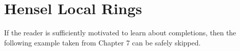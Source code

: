 \chapter{Hensel Local Rings}

If the reader is sufficiently motivated to learn about 
completions, then the following example taken from \cite{Eisenbud}
Chapter 7 can be safely skipped.



